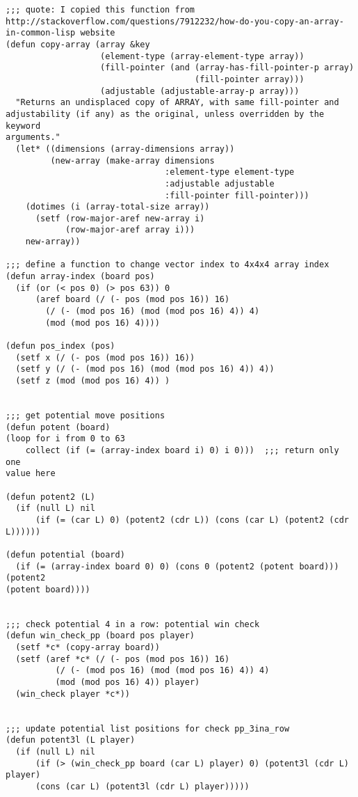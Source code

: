 \documentclass[12pt]{book}
\begin{document}
\begin{lstlisting}
;;; quote: I copied this function from http://stackoverflow.com/questions/7912232/how-do-you-copy-an-array-in-common-lisp website
(defun copy-array (array &key
                   (element-type (array-element-type array))
                   (fill-pointer (and (array-has-fill-pointer-p array)
                                      (fill-pointer array)))
                   (adjustable (adjustable-array-p array)))
  "Returns an undisplaced copy of ARRAY, with same fill-pointer and
adjustability (if any) as the original, unless overridden by the keyword
arguments."
  (let* ((dimensions (array-dimensions array))
         (new-array (make-array dimensions
                                :element-type element-type
                                :adjustable adjustable
                                :fill-pointer fill-pointer)))
    (dotimes (i (array-total-size array))
      (setf (row-major-aref new-array i)
            (row-major-aref array i)))
    new-array))

;;; define a function to change vector index to 4x4x4 array index
(defun array-index (board pos)
  (if (or (< pos 0) (> pos 63)) 0
      (aref board (/ (- pos (mod pos 16)) 16) 
        (/ (- (mod pos 16) (mod (mod pos 16) 4)) 4) 
        (mod (mod pos 16) 4))))

(defun pos_index (pos)
  (setf x (/ (- pos (mod pos 16)) 16)) 
  (setf y (/ (- (mod pos 16) (mod (mod pos 16) 4)) 4))
  (setf z (mod (mod pos 16) 4)) )


;;; get potential move positions
(defun potent (board)
(loop for i from 0 to 63
    collect (if (= (array-index board i) 0) i 0)))  ;;; return only one 
value here

(defun potent2 (L)
  (if (null L) nil
      (if (= (car L) 0) (potent2 (cdr L)) (cons (car L) (potent2 (cdr L))))))

(defun potential (board)
  (if (= (array-index board 0) 0) (cons 0 (potent2 (potent board))) (potent2
(potent board))))


;;; check potential 4 in a row: potential win check
(defun win_check_pp (board pos player)
  (setf *c* (copy-array board))
  (setf (aref *c* (/ (- pos (mod pos 16)) 16) 
          (/ (- (mod pos 16) (mod (mod pos 16) 4)) 4) 
          (mod (mod pos 16) 4)) player)
  (win_check player *c*))


;;; update potential list positions for check pp_3ina_row
(defun potent3l (L player)
  (if (null L) nil
      (if (> (win_check_pp board (car L) player) 0) (potent3l (cdr L) player)
      (cons (car L) (potent3l (cdr L) player)))))



\end{lstlisting}
\end{document}
